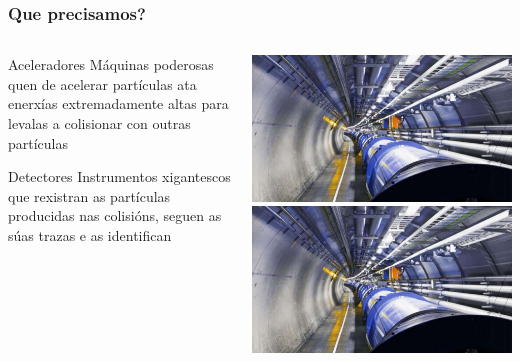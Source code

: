\documentclass{beamer}
\begin{document}
\begin{frame}
  \frametitle{Que precisamos?}

  \begin{columns}
  \begin{column}{0.45\textwidth}

    \begin{block}{Aceleradores}
    Máquinas poderosas quen de acelerar partículas ata enerxías extremadamente
    altas para levalas a colisionar con outras partículas 
    \end{block}

    \begin{block}{Detectores}
    Instrumentos xigantescos que rexistran as partículas producidas nas
    colisións, seguen as súas trazas e as identifican
    \end{block}
  \end{column}

  \begin{column}{0.45\textwidth}
    \includegraphics[width=\columnwidth, page=1]{gpx/examples.pdf}\\[5mm]
    \includegraphics[width=\columnwidth, page=3]{gpx/examples.pdf}
  \end{column}
  \end{columns}

\end{frame}
\end{document}
